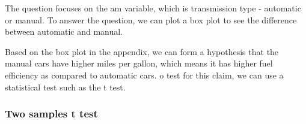 \documentclass[
]{article}
\newenvironment{Shaded}{\begin{snugshade}}{\end{snugshade}}
\newcommand{\FunctionTok}[1]{\textcolor[rgb]{0.00,0.00,0.00}{#1}}
\newcommand{\NormalTok}[1]{#1}
\newcommand{\SpecialCharTok}[1]{\textcolor[rgb]{0.00,0.00,0.00}{#1}}
\newcommand{\StringTok}[1]{\textcolor[rgb]{0.31,0.60,0.02}{#1}}
\begin{document}
The question focuses on the am variable, which is transmission type -
automatic or manual. To answer the question, we can plot a box plot to
see the difference between automatic and manual.

Based on the box plot in the appendix, we can form a hypothesis that the
manual cars have higher miles per gallon, which means it has higher fuel
efficiency as compared to automatic cars. o test for this claim, we can
use a statistical test such as the t test.

\hypertarget{two-samples-t-test}{%
\subsubsection{Two samples t test}\label{two-samples-t-test}}

\begin{Shaded}
\end{Shaded}
\end{document}
